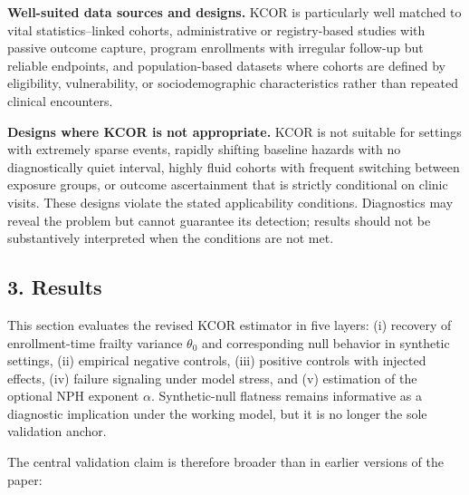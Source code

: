 \documentclass[
]{article}
\begin{document}
\textbf{Well-suited data sources and designs.} KCOR is particularly well matched to vital statistics--linked cohorts, administrative or registry-based studies with passive outcome capture, program enrollments with irregular follow-up but reliable endpoints, and population-based datasets where cohorts are defined by eligibility, vulnerability, or sociodemographic characteristics rather than repeated clinical encounters.

\textbf{Designs where KCOR is not appropriate.} KCOR is not suitable for settings with extremely sparse events, rapidly shifting baseline hazards with no diagnostically quiet interval, highly fluid cohorts with frequent switching between exposure groups, or outcome ascertainment that is strictly conditional on clinic visits. These designs violate the stated applicability conditions. Diagnostics may reveal the problem but cannot guarantee its detection; results should not be substantively interpreted when the conditions are not met.

\subsection{3. Results}\label{results}

This section evaluates the revised KCOR estimator in five layers: (i) recovery of enrollment-time frailty variance \(\theta_0\) and corresponding null behavior in synthetic settings, (ii) empirical negative controls, (iii) positive controls with injected effects, (iv) failure signaling under model stress, and (v) estimation of the optional NPH exponent \(\alpha\). Synthetic-null flatness remains informative as a diagnostic implication under the working model, but it is no longer the sole validation anchor.

The central validation claim is therefore broader than in earlier versions of the paper:
\end{document}
